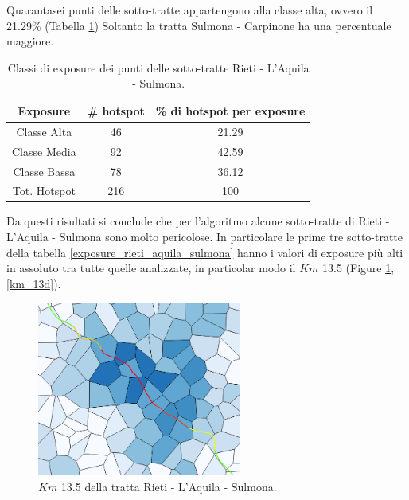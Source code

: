 Quarantasei punti delle sotto-tratte appartengono alla classe alta, ovvero il 21.29\% (Tabella \ref{risultati_rieti_aquila_sulmona}) Soltanto la tratta Sulmona - Carpinone ha una percentuale maggiore. 

\begin{table}[H]
	\centering
	\begin{tabular}{|c|c|c|}
		\hline
		\rowcolor[HTML]{C0C0C0} 
		\textbf{Exposure} & \textbf{\# hotspot} & \textbf{\% di hotspot per exposure} \\ \hline
		Classe Alta       & 46                  & 21.29                                   \\ \hline
		Classe Media      & 92                 & 42.59                         \\ \hline
		Classe Bassa      & 78              & 36.12                            \\ \hline
		Tot. Hotspot      & 216               & 100                                 \\ \hline
	\end{tabular}
	\caption{Classi di exposure dei punti delle sotto-tratte Rieti - L'Aquila - Sulmona.}
	\label{risultati_rieti_aquila_sulmona}
\end{table}
Da questi risultati si conclude che per l'algoritmo alcune sotto-tratte di Rieti - L'Aquila - Sulmona sono molto pericolose.
In particolare le prime tre sotto-tratte della tabella \ref{exposure_rieti_aquila_sulmona} hanno i valori di exposure più alti in assoluto tra tutte quelle analizzate, in particolar modo il $Km$ 13.5 (Figure \ref{km_13}, \ref{km_13d}). 

\begin{figure}[h]
	\centering
	\includegraphics[width=0.6\textwidth]{images/rietizoom}
	\caption{$Km$ 13.5 della tratta Rieti - L'Aquila - Sulmona.}
	\label{km_13}
\end{figure}

